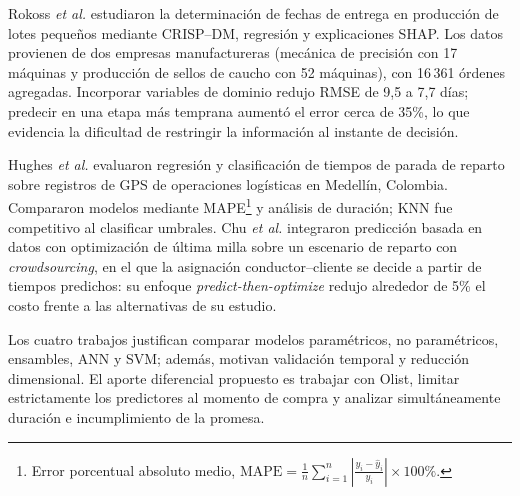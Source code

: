 \documentclass[journal]{IEEEtran}
\begin{document}
Rokoss \emph{et al.} \cite{rokoss2024} estudiaron la determinación de fechas de entrega en producción de lotes pequeños mediante CRISP--DM, regresión y explicaciones SHAP. Los datos provienen de dos empresas manufactureras (mecánica de precisión con 17 máquinas y producción de sellos de caucho con 52 máquinas), con 16\,361 órdenes agregadas. Incorporar variables de dominio redujo RMSE de 9,5 a 7,7 días; predecir en una etapa más temprana aumentó el error cerca de 35\%, lo que evidencia la dificultad de restringir la información al instante de decisión.

Hughes \emph{et al.} \cite{hughes2019} evaluaron regresión y clasificación de tiempos de parada de reparto sobre registros de GPS de operaciones logísticas en Medellín, Colombia. Compararon modelos mediante MAPE\footnote{Error porcentual absoluto medio, $\mathrm{MAPE}=\frac{1}{n}\sum_{i=1}^{n}\left|\frac{y_i-\hat{y}_i}{y_i}\right|\times 100\%$.} y análisis de duración; KNN fue competitivo al clasificar umbrales. Chu \emph{et al.} \cite{chu2023} integraron predicción basada en datos con optimización de última milla sobre un escenario de reparto con \emph{crowdsourcing}, en el que la asignación conductor--cliente se decide a partir de tiempos predichos: su enfoque \emph{predict-then-optimize} redujo alrededor de 5\% el costo frente a las alternativas de su estudio.

Los cuatro trabajos justifican comparar modelos paramétricos, no paramétricos, ensambles, ANN y SVM; además, motivan validación temporal y reducción dimensional. El aporte diferencial propuesto es trabajar con Olist, limitar estrictamente los predictores al momento de compra y analizar simultáneamente duración e incumplimiento de la promesa.

\balance


\end{document}
